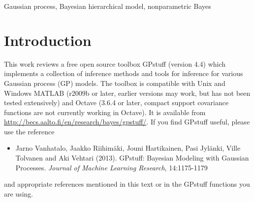 \documentclass[twoside,11pt]{article}
\newcommand{\pkg}[1]{{\fontseries{b}\selectfont #1}}
\newcommand{\proglang}{}
\begin{document}
\begin{abstract}%
  Gaussian processes (GP) are powerful tools for probabilistic
  modeling purposes. They can be used to define prior distributions 
  over latent functions in hierarchical Bayesian models. The prior
  over functions is defined implicitly by the mean and covariance
  function, which determine the smoothness and variability of the
  function. The inference can then be conducted directly in the
  function space by evaluating or approximating the posterior process.
  Despite their attractive theoretical properties GPs provide
  practical challenges in their implementation. \pkg{GPstuff} is a
  versatile collection of computational tools for GP models compatible
  with Linux and Windows \proglang{MATLAB} and Octave.  It includes,
  among others, various inference methods, sparse approximations and
  tools for model assessment. In this work, we review these tools and
  demonstrate the use of \pkg{GPstuff} in several models.\\ Last updated 2014-04-11.
\end{abstract}

\begin{keywords}
Gaussian process, Bayesian hierarchical model, nonparametric Bayes
\end{keywords}

% 

\newpage

\tableofcontents

\section{Introduction}

This work reviews a free open source toolbox \pkg{GPstuff} (version
4.4) which implements a collection of inference methods and tools for
inference for various Gaussian process (GP) models. The toolbox is
compatible with Unix and Windows \proglang{MATLAB} \citep{MATLAB:2010}
(r2009b or later, earlier versions may work, but has not been tested
extensively) and \proglang{Octave} \citep{octave:2012} (3.6.4 or
later, compact support covariance functions are not currently working
in Octave). It is available from
\url{http://becs.aalto.fi/en/research/bayes/gpstuff/}.
If you find GPstuff useful, please use the reference \citep{Vanhatalo+gpstuff:2013}
\begin{itemize}
\item[] Jarno Vanhatalo, Jaakko Riihim{\"a}ki, Jouni Hartikainen, Pasi
  Jyl{\"a}nki, Ville Tolvanen and Aki Vehtari (2013). GPstuff: Bayesian
  Modeling with Gaussian Processes. \emph{Journal of Machine Learning
    Research}, 14:1175-1179
\end{itemize}
and appropriate references mentioned in this text or in the GPstuff
functions you are using.
\end{document}
